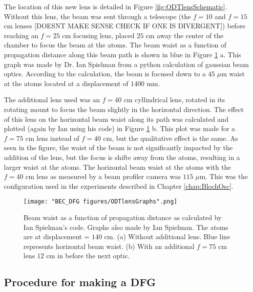 The location of this new lens is detailed in Figure \ref{fig:ODTlensSchematic}. Without this lens, the beam was sent through a telescope (the $f=10$ and $f=15$ cm lenses [DOESNT MAKE SENSE CHECK IF ONE IS DIVERGENT]) before reaching an $f=25$ cm focusing lens, placed $25$ cm away the center of the chamber to focus the beam at the atoms. The beam waist as a function of propagation distance along this beam path is shown in blue in Figure \ref{fig:ODTlensGraphs} a. This graph was made by Dr. Ian Spielman from a python calculation of gaussian beam optics. According to the calculation, the beam is focused down to a $45$ $\mu$m waist at the atoms located at a displacement of $1400$ mm. 

The additional lens used was an $f=40$ cm cyllindrical lens, rotated in its rotating mount to focus the beam slightly in the horizontal direction. The effect of this lens on the horizontal beam waist along its path was calculated and plotted (again by Ian using his code) in Figure \ref{fig:ODTlensGraphs} b. This plot was made for a $f=75$ cm lens instead of $f=40$ cm, but the qualitative effect is the same. As seen in the figure, the waist of the beam is not significantly impacted by the addition of the lens, but the focus is shifte away from the atoms, resulting in a larger waist at the atoms. The horizontal beam waist at the atoms with the $f=40$ cm lens as measured by a beam profiler camera was $115$ $\mu$m. This was the configuration used in the experiments described in Chapter \ref{chap:BlochOsc}.

\begin{figure}
	\texttt{[image: "BEC\_DFG figures/ODTlensGraphs".png]}
\caption{Beam waist as a function of propagation distance as calculated by Ian Spielman's code.  Graphs also made by Ian Spielman. The atoms are at displacement = $140$ cm. (a) Without additional lens. Blue line represents horizontal beam waist. (b) With an additional $f=75$ cm lens $12$ cm in before the next optic. }
\label{fig:ODTlensGraphs}
\end{figure}

\subsection{Procedure for making a DFG}\label{sec:DFGsequence}

